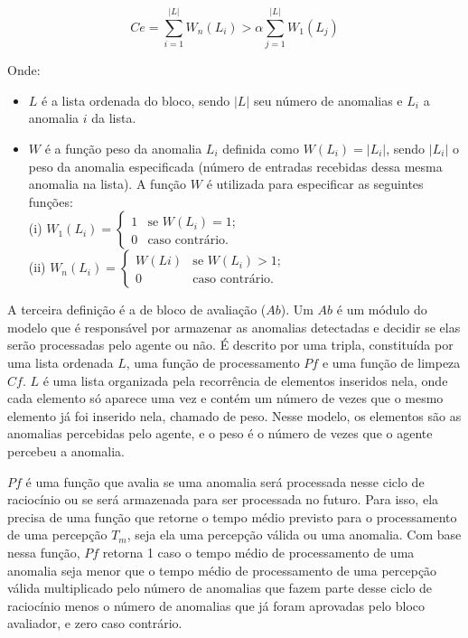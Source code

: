 \begin{definition}
\begin{itemize}
            \[ Ce = \sum_{i=1}^{|L|} W_{n}(L_{i}) > \alpha \sum_{j=1}^{|L|} W_{1}(L_{j}) \]
            
            Onde:
            
            \begin{itemize}
                \item $L$ é a lista ordenada do bloco, sendo $|L|$ seu número de anomalias e $L_{i}$ a anomalia $i$ da lista.
                \item $W$ é a função peso da anomalia $L_{i}$ definida como $W(L_{i}) = |L_{i}|$, sendo $|L_{i}|$ o peso da anomalia especificada (número de entradas recebidas dessa mesma anomalia na lista). A função $W$ é utilizada para especificar as seguintes funções:
                \\
                
                    (i) $ W_{1}(L_{i}) = \left\{ \begin{array}{ll}
                        1 & \mbox{se $W(L_{i}) = 1$;}\\
                        0 & \mbox{caso contrário}.\end{array} \right. $
                \\
                
                    (ii) $ W_{n}(L_{i}) = \left\{ \begin{array}{ll}
                        W(L{i}) & \mbox{se $W(L_{i}) > 1$;}\\
                        0 & \mbox{caso contrário}.\end{array} \right. $
            \end{itemize}{}
    \end{itemize}
\end{definition}{}

A terceira definição é a de bloco de avaliação ($Ab$). Um $Ab$ é um módulo do modelo que é responsável por armazenar as anomalias detectadas e decidir se elas serão processadas pelo agente ou não. É descrito por uma tripla, constituída por uma lista ordenada $L$, uma função de processamento $Pf$ e uma função de limpeza $Cf$. $L$ é uma lista organizada pela recorrência de elementos inseridos nela, onde cada elemento só aparece uma vez e contém um número de vezes que o mesmo elemento já foi inserido nela, chamado de peso. Nesse modelo, os elementos são as anomalias percebidas pelo agente, e o peso é o número de vezes que o agente percebeu a anomalia.

$Pf$ é uma função que avalia se uma anomalia será processada nesse ciclo de raciocínio ou se será armazenada para ser processada no futuro. Para isso, ela precisa de uma função que retorne o tempo médio previsto para o processamento de uma percepção $T_m$, seja ela uma percepção válida ou uma anomalia. Com base nessa função, $Pf$ retorna 1 caso o tempo médio de processamento de uma anomalia seja menor que o tempo médio de processamento de uma percepção válida multiplicado pelo número de anomalias que fazem parte desse ciclo de raciocínio menos o número de anomalias que já foram aprovadas pelo bloco avaliador, e zero caso contrário.

